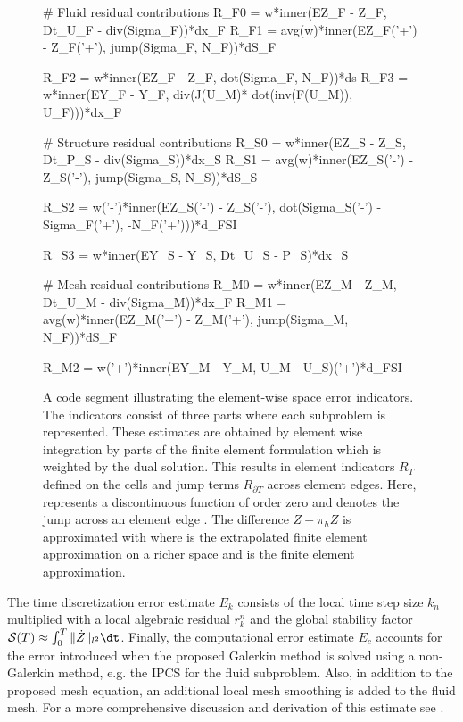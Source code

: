\begin{figure}
\begin{python}
# Fluid residual contributions
R_F0 = w*inner(EZ_F - Z_F, Dt_U_F - div(Sigma_F))*dx_F
R_F1 = avg(w)*inner(EZ_F('+') - Z_F('+'),
              jump(Sigma_F, N_F))*dS_F

R_F2 = w*inner(EZ_F - Z_F, dot(Sigma_F, N_F))*ds
R_F3 = w*inner(EY_F - Y_F, div(J(U_M)*
         dot(inv(F(U_M)), U_F)))*dx_F

# Structure residual contributions
R_S0 = w*inner(EZ_S - Z_S, Dt_P_S - div(Sigma_S))*dx_S
R_S1 = avg(w)*inner(EZ_S('-') - Z_S('-'),
             jump(Sigma_S, N_S))*dS_S

R_S2 = w('-')*inner(EZ_S('-') - Z_S('-'),
             dot(Sigma_S('-') - Sigma_F('+'),
             -N_F('+')))*d_FSI

R_S3 = w*inner(EY_S - Y_S, Dt_U_S - P_S)*dx_S

# Mesh residual contributions
R_M0 = w*inner(EZ_M - Z_M, Dt_U_M - div(Sigma_M))*dx_F
R_M1 = avg(w)*inner(EZ_M('+') - Z_M('+'),
              jump(Sigma_M, N_F))*dS_F

R_M2 = w('+')*inner(EY_M - Y_M, U_M - U_S)('+')*d_FSI
\end{python}
\caption{A code segment illustrating the element-wise space error
  indicators. The indicators consist of three parts where each
  subproblem is represented. These estimates are obtained by element
  wise integration by parts of the finite element formulation which is
  weighted by the dual solution. This results in element indicators
  $R_T$ defined on the cells and jump terms $R_{\partial T}$ across
  element edges. Here,  represents a discontinuous function of
  order zero and  denotes the jump across an element edge
  . The difference $Z -\pi_h Z$ is approximated with  where  is the extrapolated finite element approximation
  on a richer space and  is the finite element approximation.}
\label{selim:fig:strong_residuals}
\end{figure}
The time discretization error estimate $E_k$ consists of the local time
step size $k_n$ multiplied with a local algebraic residual
$r_k^n$ and the global stability factor $\mathcal{S}(T) \approx
\int_0^T \| \dot{Z} \|_{l^2}\dt$. Finally, the computational error
estimate $E_c$ accounts for the error introduced when the proposed
Galerkin method is solved using a non-Galerkin method, e.g. the IPCS
for the fluid subproblem. Also, in addition to the proposed mesh
equation, an additional local mesh smoothing is added to the fluid
mesh.  For a more comprehensive discussion and derivation of this
\apost{} estimate see \citet{SelimLogg2011a}.

